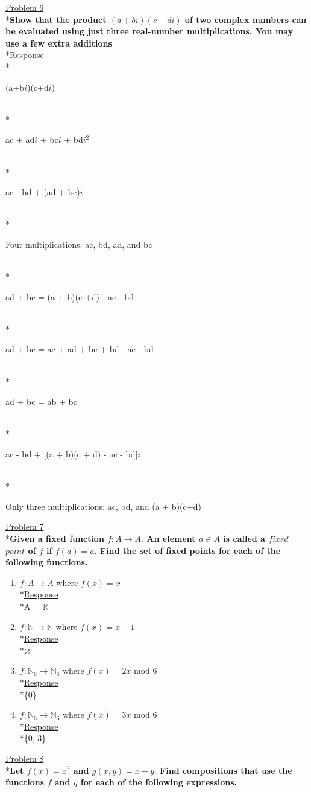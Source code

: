 \documentclass[12pt]{article}
\begin{document}
\medskip
\uline{Problem 6}
\\*\textbf{Show that the product $(a + bi) (c + di)$ of two complex numbers can be evaluated using just three real-number multiplications. You may use a few extra additions}
\smallskip
\\*\uline{Response}
\smallskip
\\*\centerline{(a+b$i$)(c+d$i$)}
\\*\centerline{ac + ad$i$ + bc$i$ + bd$i^2$}
\\*\centerline{ac - bd + (ad + bc)$i$}
\\*\centerline{Four multiplications: ac, bd, ad, and bc}
\smallskip
\\*\centerline{ad + bc = (a + b)(c +d) - ac - bd}
\\*\centerline{ad + bc = ac + ad + bc + bd - ac - bd}
\\*\centerline{ad + bc = ab + bc}
\smallskip
\\*\centerline{ac - bd + [(a + b)(c + d) - ac - bd]$i$}
\\*\centerline{Only three multiplications: ac, bd, and (a + b)(c+d)}
\newpage
\noindent
\uline{Problem 7}
\\*\textbf{Given a fixed function $f: A \to A.$ An element $a \in A$ is called a $fixed$ $point$ of $f$ if $f(a) = a.$ Find the set of fixed points for each of the following functions.}
\begin{enumerate}
\item $f: A \to A$ where $f(x) = x$
\smallskip
\\*\uline{Response}
\\*A = $\mathbb{R}$
\item $f: \mathbb{N} \to \mathbb{N}$ where $f(x) = x + 1$
\smallskip
\\*\uline{Response}
\\*$\varnothing$
\item $f: \mathbb{N}_6 \to \mathbb{N}_6$ where $f(x) = 2x$ mod 6
\smallskip
\\*\uline{Response}
\\*\{0\}
\item $f: \mathbb{N}_6 \to \mathbb{N}_6$ where $f(x) = 3x$ mod 6
\smallskip
\\*\uline{Response}
\\*\{0, 3\}
\end{enumerate}
\medskip
\uline{Problem 8}
\\*\textbf{Let $f(x) = x^2$ and $g(x,y) = x + y.$ Find compositions that use the functions $f$ and $g$ for each of the following expressions.}
\end{document}
